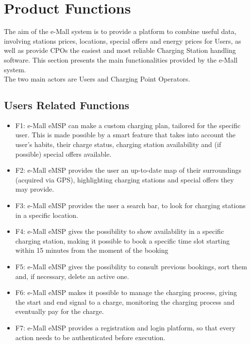 \documentclass[12pt]{report}
\begin{document}
\section{Product Functions}
The aim of the e-Mall system is to provide a platform to combine useful data, involving stations prices, locations, special offers and energy prices for Users, as well as provide CPOs the easiest and most reliable Charging Station handling software. This section presents the main functionalities provided by the e-Mall system.\\
The two main actors are Users and Charging Point Operators.

\subsection{Users Related Functions}
\begin{itemize}
    \item F1: e-Mall eMSP can make a custom charging plan, tailored for the specific user. This is made possible by a smart feature that takes into account the user's habits, their charge status, charging station availability and (if possible) special offers available.
    \item F2: e-Mall eMSP provides the user an up-to-date map of their surroundings (acquired via GPS), highlighting charging stations and special offers they may provide.
    \item F3: e-Mall eMSP provides the user a search bar, to look for charging stations in a specific location.
    \item F4: e-Mall eMSP gives the possibility to show availability in a specific charging station, making it possible to book a specific time slot starting within 15 minutes from the moment of the booking
    \item F5: e-Mall eMSP gives the possibility to consult previous bookings, sort them and, if necessary, delete an active one.
    \item F6: e-Mall eMSP makes it possible to manage the charging process, giving the start and end signal to a charge, monitoring the charging process and eventually pay for the charge.
    \item F7: e-Mall eMSP provides a registration and login platform, so that every action needs to be authenticated before execution.
\end{itemize}
\end{document}
